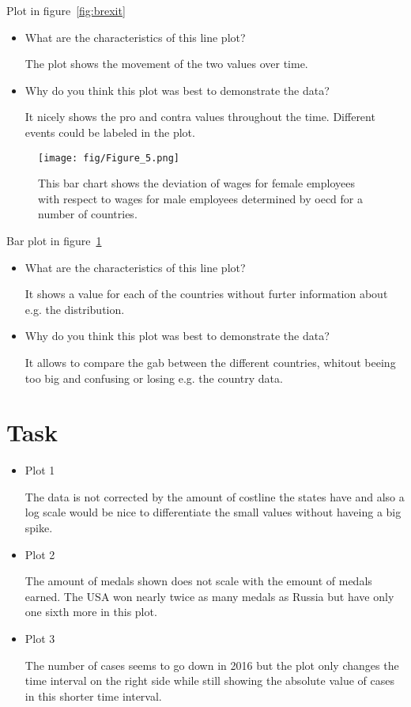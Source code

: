 \documentclass[a4paper, 11pt]{article}
\begin{document}
Plot in figure~\ref{fig:brexit}

\begin{itemize}
    \item What are the characteristics of this line plot?

    The plot shows the movement of the two values over time.

    \item Why do you think this plot was best to demonstrate the data?
    
    It nicely shows the pro and contra values throughout the time. Different events could be labeled in the plot.
\end{itemize}

\newpage

\begin{figure}[h!] 
    \centering
    \texttt{[image: fig/Figure\_5.png]}
    \caption{This bar chart shows the deviation of wages for female employees with respect to wages for male employees determined by oecd for a number of countries.}
    \label{fig:gwg}
\end{figure}

Bar plot in figure~\ref{fig:gwg}

\begin{itemize}
    \item What are the characteristics of this line plot?

    It shows a value for each of the countries without furter information about e.g. the distribution.

    \item Why do you think this plot was best to demonstrate the data?
    
    It allows to compare the gab between the different countries, whitout beeing too big and confusing or losing e.g. the country data. 
\end{itemize}

\newpage

\section{Task}

\begin{itemize}
    \item Plot 1
    
    The data is not corrected by the amount of costline the states have and also a log scale would be nice to differentiate the small values without haveing a big spike.

    \item Plot 2
    
    The amount of medals shown does not scale with the emount of medals earned. The USA won nearly twice as many medals as Russia but have only one sixth more in this plot.

    \item Plot 3
    
    The number of cases seems to go down in 2016 but the plot only changes the time interval on the right side while still showing the absolute value of cases in this shorter time interval.
\end{itemize}
\end{document}
